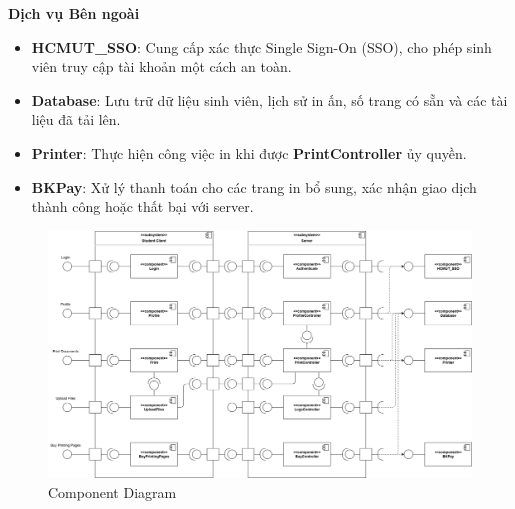 \textbf{Dịch vụ Bên ngoài}
\begin{itemize}
    \item \textbf{HCMUT\_SSO}: Cung cấp xác thực Single Sign-On (SSO), cho phép sinh viên truy cập tài khoản một cách an toàn.
    \item \textbf{Database}: Lưu trữ dữ liệu sinh viên, lịch sử in ấn, số trang có sẵn và các tài liệu đã tải lên.
    \item \textbf{Printer}: Thực hiện công việc in khi được \textbf{PrintController} ủy quyền.
    \item \textbf{BKPay}: Xử lý thanh toán cho các trang in bổ sung, xác nhận giao dịch thành công hoặc thất bại với server.
\end{itemize}
\newpage
\begin{figure}[htbp]
    \centering
    \includegraphics[width=1\linewidth]{Images/Diagrams/Print_component.png}
    \caption{Component Diagram}
\end{figure}
